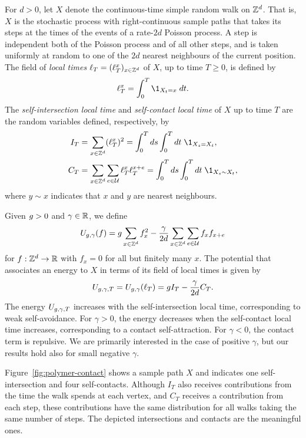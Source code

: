 For $d>0$, let $X$ denote the continuous-time simple random walk on ${ {{\mathbb Z}}^d }$.
That is, $X$ is the stochastic process
with right-continuous sample paths that takes its steps at the times
of the events of a rate-$2d$ Poisson process.  A step is independent both
of the Poisson process and of all other steps, and is taken uniformly
at random to one of the $2d$ nearest neighbours of the current
position.
The field of \emph{local times} $\ell_T = (\ell_T^x)_{x\in {\mathbb Z}^d}$
of  $X$, up to time $T \ge 0$,
is defined by
\begin{equation}
\label{e:LTx-def}
  \lt_T^x = \int_0^T \1_{X_t = x} \; dt
  .
\end{equation}
The \emph{self-intersection local time} and \emph{self-contact local time}
of $X$ up to time $T$ are the random variables defined, respectively, by
\begin{align}
\label{e:ITdef}
  I_T &=
  \sum_{x \in \Z^d} (\lt_T^x)^2
  = \int_0^T ds \int_0^T dt \; \1_{X_{s}=X_{t}}
  ,\\
\lbeq{CTdef}
  C_T
  &=
  \sum_{x \in \Z^d}\sum_{e\in\Ucal} \lt_T^x\lt_T^{x+e}
  = \int_0^T ds \int_0^T dt \; \1_{X_{s} \sim X_{t}}
  ,
\end{align}
where
$y\sim x$ indicates that $x$ and $y$ are nearest neighbours.

Given $g > 0$ and $\gamma \in {\mathbb R}$,
we define
\begin{equation}
\label{e:Udef-neg}
U_{g,\gamma}(f)
=
g \sum_{x\in{ {{\mathbb Z}}^d }} f_x^2
- \frac{\gamma}{2d}
\sum_{x\in{ {{\mathbb Z}}^d }} \sum_{e\in\mathcal{U}} f_x f_{x+e}
\end{equation}
for $f:{ {{\mathbb Z}}^d }\rightarrow {\mathbb R}$ with $f_x = 0$
for all but finitely many $x$.
The potential that associates an energy to $X$ in terms of its
field of local times is given by
\begin{equation}
  \label{e:V}
  U_{g,\gamma,T}
  =
  U_{g,\gamma}(\ell_T)
  =
  g I_T
  - \frac{\gamma}{2d}
  C_T
  .
\end{equation}
The energy $U_{g,\gamma,T}$ increases with the self-intersection local time,
corresponding to weak self-avoidance.  For $\gamma >0$, the energy decreases
when the self-contact local time increases, corresponding to a contact self-attraction.
For $\gamma<0$, the contact term is repulsive.  We are primarily interested in
the case of positive $\gamma$, but our results hold also for small negative $\gamma$.

Figure~\ref{fig:polymer-contact} shows a sample path $X$
and indicates one self-intersection and four self-contacts.
Although $I_T$ also receives contributions from the
time the walk spends at each vertex, and $C_T$ receives a contribution from each step,
these contributions have the same distribution for all walks taking the same number
of steps.  The depicted intersections and contacts are the meaningful ones.


